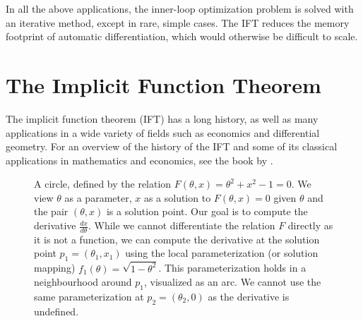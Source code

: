 \documentclass[11pt]{article}
\begin{document}
In all the above applications, the inner-loop optimization problem is solved
with an iterative method, except in rare, simple cases.
The IFT reduces the memory footprint of automatic differentiation,
which would otherwise be difficult to scale.

\section{The Implicit Function Theorem}
The implicit function theorem (IFT) has a long history, as well as many applications
in a wide variety of fields such as economics and differential geometry.
For an overview of the history of the IFT and some of its classical applications
in mathematics and economics,
see the book by \citet{iftbook}.

\begin{figure}
\centering
{}
\caption{
\label{fig:circle}
A circle, defined by the relation $F(\theta,x) = \theta^2 + x^2 - 1 = 0$.
We view $\theta$ as a parameter, $x$ as a solution to $F(\theta,x)=0$ given $\theta$
and the pair $(\theta,x)$ is a solution point.
Our goal is to compute the derivative $\frac{dx}{d\theta}$.
While we cannot differentiate the relation $F$ directly as it is not a function,
we can compute the derivative at the solution point $p_1 = (\theta_1,x_1)$
using the local parameterization (or solution mapping) $f_1(\theta)=\sqrt{1-\theta^2}$.
This parameterization holds
in a neighbourhood around $p_1$, visualized as an arc.
We cannot use the same parameterization at $p_2 = (\theta_2, 0)$ as the derivative is undefined.
}
\end{figure}
\end{document}
